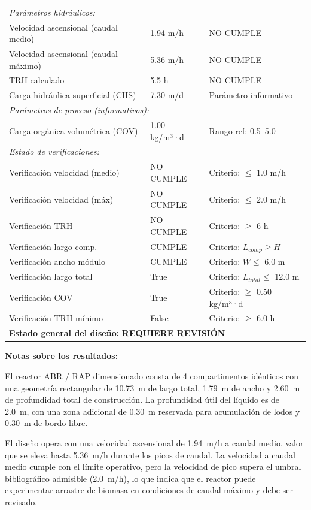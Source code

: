 \documentclass[12pt,a4paper]{article}
\begin{document}
\begin{longtable}{p{6cm}p{3cm}p{5cm}}
\multicolumn{3}{l}{\textit{Parámetros hidráulicos:}} \\
Velocidad ascensional (caudal medio) & 1.94 m/h & NO CUMPLE \\
Velocidad ascensional (caudal máximo) & 5.36 m/h & NO CUMPLE \\
TRH calculado & 5.5 h & NO CUMPLE \\
Carga hidráulica superficial (CHS) & 7.30 m/d & Parámetro informativo \\
\midrule

\multicolumn{3}{l}{\textit{Parámetros de proceso (informativos):}} \\
Carga orgánica volumétrica (COV) & 1.00 kg/m³·d & Rango ref: 0.5--5.0 \\
\midrule

\multicolumn{3}{l}{\textit{Estado de verificaciones:}} \\
Verificación velocidad (medio) & NO CUMPLE & Criterio: $\leq$ 1.0 m/h \\
Verificación velocidad (máx) & NO CUMPLE & Criterio: $\leq$ 2.0 m/h \\
Verificación TRH & NO CUMPLE & Criterio: $\geq$ 6 h \\
Verificación largo comp. & CUMPLE & Criterio: $L_{comp} \geq H$ \\
Verificación ancho módulo & CUMPLE & Criterio: $W \leq$ 6.0 m \\
Verificación largo total & True & Criterio: $L_{total} \leq$ 12.0 m \\
Verificación COV & True & Criterio: $\geq$ 0.50 kg/m³·d \\
Verificación TRH mínimo & False & Criterio: $\geq$ 6.0 h \\
\bottomrule
\multicolumn{3}{l}{\textbf{Estado general del diseño:} \textbf{REQUIERE REVISIÓN}} \\
\end{longtable}

\textbf{Notas sobre los resultados:}

El reactor ABR / RAP dimensionado consta de 4 compartimentos idénticos con una geometría rectangular de 10.73~m de largo total, 1.79~m de ancho y 2.60~m de profundidad total de construcción. La profundidad útil del líquido es de 2.0~m, con una zona adicional de 0.30~m reservada para acumulación de lodos y 0.30~m de bordo libre.

El diseño opera con una velocidad ascensional de 1.94~m/h a caudal medio, valor que se eleva hasta 5.36~m/h durante los picos de caudal. La velocidad a caudal medio cumple con el límite operativo, pero la velocidad de pico supera el umbral bibliográfico admisible (2.0~m/h), lo que indica que el reactor puede experimentar arrastre de biomasa en condiciones de caudal máximo y debe ser revisado.
\end{document}
